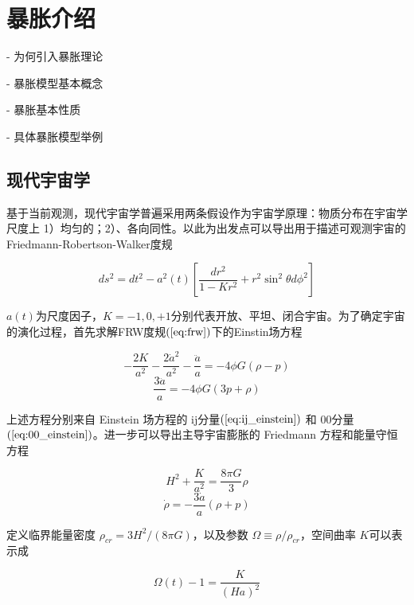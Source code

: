 \section{暴胀介绍}


- 为何引入暴胀理论


- 暴胀模型基本概念

- 暴胀基本性质

- 具体暴胀模型举例

\subsection{现代宇宙学}
基于当前观测，现代宇宙学普遍采用两条假设作为宇宙学原理：物质分布在宇宙学尺度上
1）均匀的；2）、各向同性。以此为出发点可以导出用于描述可观测宇宙的
Friedmann-Robertson-Walker度规

\begin{equation}\label{eq:frw}
    ds^2=dt^2-a^2(t)\left[\frac{dr^2}{1-Kr^2}+r^2\sin^2\theta d\phi^2\right]
\end{equation}

$a(t)$为尺度因子，$K=-1, 0,
+1$分别代表开放、平坦、闭合宇宙。为了确定宇宙的演化过程，首先求解FRW度规$(\ref{eq:frw})$下的Einstin场方程

\begin{equation}\label{eq:ij_einstein}
    -\frac{2K}{a^2}-\frac{2\dot{a}^2}{a^2}-\frac{\ddot{a}}{a}=-4\phi G(\rho-p)
\end{equation}
\begin{equation}\label{eq:00_einstein}
    \frac{3\ddot{a}}{a}=-4\phi G(3p+\rho)
\end{equation}

上述方程分别来自 Einstein 场方程的 ij分量$(\ref{eq:ij_einstein})$ 和
00分量$(\ref{eq:00_einstein})$。进一步可以导出主导宇宙膨胀的 Friedmann
方程和能量守恒方程

\begin{equation}\label{eq:friedmann_equation}
    H^2+\frac{K}{a^2}=\frac{8\pi G}{3}\rho
\end{equation}
\begin{equation}\label{eq:energy_conservation}
    \dot{\rho}=-\frac{3\dot{a}}{a}(\rho+p)
\end{equation}

定义临界能量密度 $\rho_{cr}=3H^2/(8\pi G)$，以及参数 $\Omega\equiv
\rho/\rho_{cr}$，空间曲率 $K$可以表示成

\begin{equation}\label{eq:flatness}
    \Omega(t) - 1 = \frac{K}{{(Ha)}^2} 
\end{equation}

